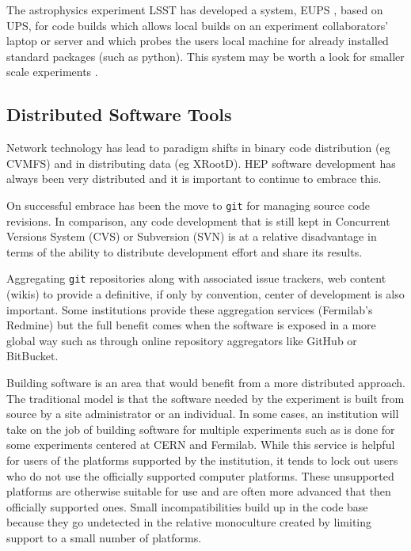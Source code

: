 The astrophysics experiment LSST has developed a system, EUPS \cite{lssteups}, 
based on UPS, for code builds which allows local builds on an experiment 
collaborators' laptop or server and which probes the users local machine 
for already installed standard packages (such as python).   This system
may be worth a look for smaller scale experiments \cite{lsstwiki}.

\subsection{Distributed Software Tools}

Network technology has lead to paradigm shifts in binary code
distribution (eg CVMFS) and in distributing data (eg XRootD).  HEP
software development has always been very distributed and it is
important to continue to embrace this.

On successful embrace has been the move to \texttt{git} for managing source
code revisions.  In comparison, any code development that is still
kept in Concurrent Versions System (CVS) or Subversion (SVN) is at a
relative disadvantage in terms of the ability to distribute
development effort and share its results.

Aggregating \texttt{git} repositories along with associated issue trackers, web
content (wikis) to provide a definitive, if only by convention, center
of development is also important.  Some institutions provide these
aggregation services (Fermilab's Redmine) but the full benefit comes
when the software is exposed in a more global way such as through
online repository aggregators like GitHub or BitBucket.

Building software is an area that would benefit from a more
distributed approach.  The traditional model is that the software
needed by the experiment is built from source by a site administrator
or an individual.  In some cases, an institution will take on the job
of building software for multiple experiments such as is done for some
experiments centered at CERN and Fermilab.  While this service is
helpful for users of the platforms supported by the institution, it
tends to lock out users who do not use the officially supported
computer platforms.  These unsupported platforms are otherwise
suitable for use and are often more advanced that then officially
supported ones.  Small incompatibilities build up in the code base
because they go undetected in the relative monoculture created by
limiting support to a small number of platforms.

